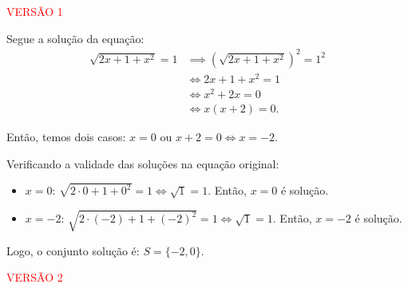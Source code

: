 
\textcolor{red}{ VERSÃO 1 } %



Segue a solução da equação:
\begin{align*} %
    \sqrt{2x + 1  + x^{2}} = 1 & \implies (\sqrt{2x + 1  + x^{2}})^{2} = 1^{2} \\
                               & \iff 2x + 1 + x^{2} = 1                       \\
                               & \iff x^{2} + 2x = 0                           \\
                               & \iff x(x+2) = 0.
\end{align*}

Então, temos dois casos: $x = 0$ ou $x + 2 = 0 \iff x = -2$.

Verificando a validade das soluções na equação original:

\begin{itemize}
    \item $x = 0$: $\sqrt{2 \cdot 0 + 1 + 0^{2}} = 1 \iff \sqrt{1} = 1$. Então, $x = 0$ é solução.
    \item $x = -2$: $\sqrt{2 \cdot (-2) + 1 + (-2)^{2}} = 1 \iff \sqrt{1} = 1$. Então, $x = -2$ é solução.
\end{itemize}
Logo, o conjunto solução é: $S = \{-2, 0 \}$.

\bigskip

\textcolor{red}{ VERSÃO 2} %

